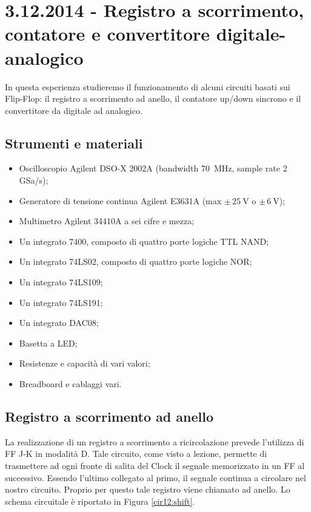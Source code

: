 \section{3.12.2014 - Registro a scorrimento, contatore e convertitore digitale-analogico}

\label{rel12:label}

In questa esperienza studieremo il funzionamento di alcuni circuiti basati sui Flip-Flop: il registro a scorrimento ad anello, il contatore up/down sincrono e il convertitore da digitale ad analogico.

\subsection*{Strumenti e materiali}

\begin{itemize} [noitemsep]
	\item Oscilloscopio Agilent DSO-X 2002A (bandwidth \SI{70}{\mega\hertz}, sample rate \num{2} GSa/s);
	\item Generatore di tensione continua Agilent E3631A (max $\pm \, \SI{25}{\volt}$ o $\pm \, \SI{6}{\volt}$);
	\item Multimetro Agilent 34410A a sei cifre e mezza;
	\item Un integrato 7400, composto di quattro porte logiche TTL NAND; %
	\item Un integrato 74LS02, composto di quattro porte logiche NOR;
	\item Un integrato 74LS109;
	\item Un integrato 74LS191;
	\item Un integrato DAC08;	
	\item Basetta a LED;		
	\item Resistenze e capacità di vari valori;
	\item Breadboard e cablaggi vari.
\end{itemize}

\subsection{Registro a scorrimento ad anello}

La realizzazione di un registro a scorrimento a ricircolazione prevede l'utilizza di FF J-K in modalità D. Tale circuito, come visto a lezione, permette di trasmettere ad ogni fronte di salita del Clock il segnale memorizzato in un FF al successivo. Essendo l'ultimo collegato al primo, il segnale continua a circolare nel nostro circuito. Proprio per questo tale registro viene chiamato ad anello. Lo schema circuitale è riportato in Figura \ref{cir12:shift}.

